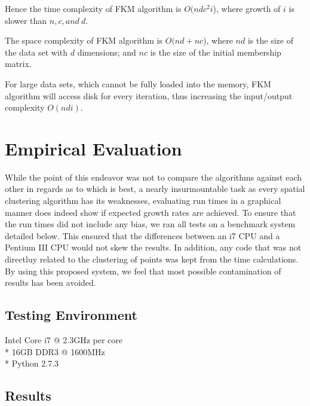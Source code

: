 \documentclass[conference, 10pt]{IEEEtran}
\begin{document}
Hence the time complexity of FKM algorithm is $O(ndc^2i$), where growth of $i$ is slower than $n, c, and\:d$.

The space complexity of FKM algorithm is $O(nd+nc$), where $nd$ is the size of the data set with $d$ dimensions; and $nc$ is the size of the initial membership matrix.

For large data sets, which cannot be fully loaded into the memory, FKM algorithm will access
disk for every iteration, thus increasing the input/output complexity $O(ndi)$.

\section{Empirical Evaluation}
While the point of this endeavor was not to compare the algorithms against each other in regards as to which is best, a nearly insurmountable task as every spatial clustering algorithm has its weaknesses, evaluating run times in a graphical manner does indeed show if expected growth rates are achieved. To ensure that the run times did not include any bias, we ran all tests on a benchmark system detailed below. This ensured that the differences between an i7 CPU and a Pentium III CPU would not skew the results. In addition, any code that was not directluy related to the clustering of points was kept from the time calculations. By using this proposed system, we feel that most possible contamination of results has been avoided.

\subsection{Testing Environment}
\begin{center}
Intel Core i7 @ 2.3GHz per core\\*
16GB DDR3 @ 1600MHz\\*
Python 2.7.3
\end{center}

\subsection{Results}
\end{document}
